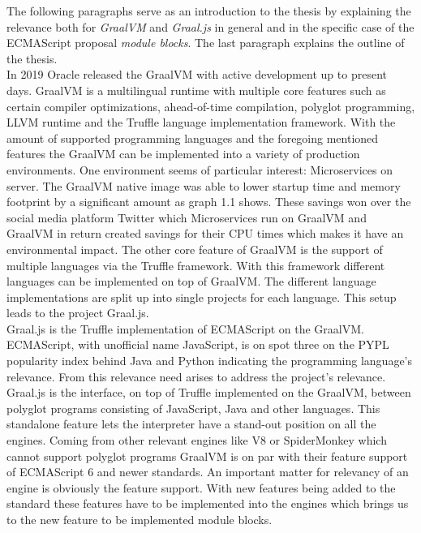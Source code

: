 The following paragraphs serve as an introduction to the thesis by explaining the relevance both for \emph{GraalVM} and \emph{Graal.js} in general and in the specific case of the ECMAScript proposal \emph{module blocks}. The last paragraph explains the outline of the thesis.\\
In 2019 Oracle released the GraalVM with active development up to present days. GraalVM is a multilingual runtime with multiple core features such as certain compiler optimizations, ahead-of-time compilation, polyglot programming, LLVM runtime and the Truffle language implementation framework. With the amount of supported programming languages and the foregoing mentioned features the GraalVM can be implemented into a variety of production environments. One environment seems of particular interest: Microservices on server. The GraalVM native image was able to lower startup time and memory footprint by a significant amount as graph 1.1 shows. These savings won over the social media platform Twitter which Microservices run on GraalVM and GraalVM in return created savings for their CPU times which makes it have an environmental impact. The other core feature of GraalVM is the support of multiple languages via the Truffle framework. With this framework different languages can be implemented on top of GraalVM. The different language implementations are split up into single projects for each language. This setup leads to the project Graal.js.\\
Graal.js is the Truffle implementation of ECMAScript on the GraalVM. ECMAScript, with unofficial name JavaScript, is on spot three on the PYPL \cite{pypl} popularity index behind Java and Python indicating the programming language's relevance. From this relevance need arises to address the project's relevance. Graal.js is the interface, on top of Truffle implemented on the GraalVM, between polyglot programs consisting of JavaScript, Java and other languages. This standalone feature lets the interpreter have a stand-out position on all the engines. Coming from other relevant engines like V8 or SpiderMonkey which cannot support polyglot programs GraalVM is on par with their feature support of ECMAScript 6 and newer standards. An important matter for relevancy of an engine is obviously the feature support. With new features being added to the standard these features have to be implemented into the engines which brings us to the new feature to be implemented module blocks.\\

